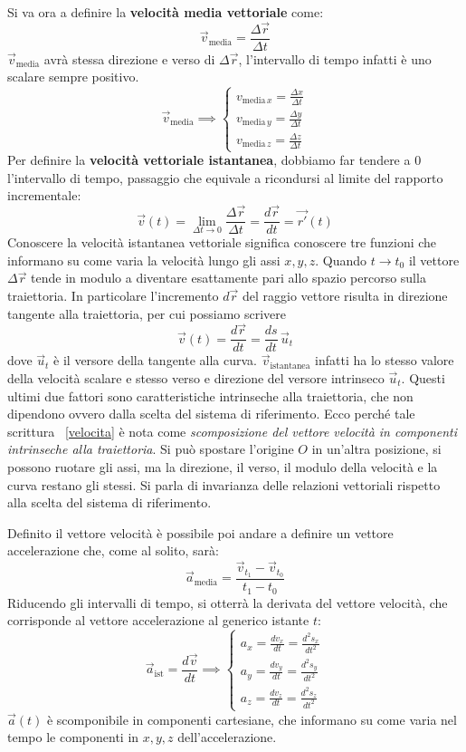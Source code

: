 \documentclass[10pt,a4paper]{book}
\begin{document}
Si va ora a definire la \textbf{velocità media vettoriale} come:
\[
	\vec{v}_{\text{media}}=\frac{\Delta\vec{r}}{\Delta t}
\]
$\vec{v}_{\text{media}}$ avrà stessa direzione e verso di $\Delta\vec{r}$, l'intervallo di tempo infatti è uno scalare sempre positivo.
\[
	\vec{v}_{\text{media}}\implies \begin{cases} v_{\text{media} \,x} =\frac{\Delta x}{\Delta t} \\ v_{\text{media} \,y} =\frac{\Delta y}{\Delta t} \\ v_{\text{media} \,z} =\frac{\Delta z}{\Delta t} \end{cases}
\]
Per definire la \textbf{velocità vettoriale istantanea}, dobbiamo far tendere a $0$ l'intervallo di tempo, passaggio che equivale a ricondursi al limite del rapporto incrementale:
\[
	\vec{v}(t)=\lim_{\Delta t \to 0} \frac{\Delta \vec{r}}{\Delta t}=\frac{d\vec{r}}{dt}=\vec{r'}(t)
\]
Conoscere la velocità istantanea vettoriale significa conoscere tre funzioni che informano su come varia la velocità lungo gli assi $x, y, z$. Quando $t \to t_0$ il vettore $\Delta\vec{r}$ tende in modulo a diventare esattamente pari allo spazio percorso sulla traiettoria. In particolare l'incremento $d\vec{r}$ del raggio vettore risulta in direzione tangente alla traiettoria, per cui possiamo scrivere
\begin{equation}
	\label{velocita}
	\boxed{\vec{v}(t)=\frac{d\vec{r}}{dt}=\frac{ds}{dt}\,\vec{u}_t}
\end{equation}
dove $\vec{u}_t$ è il versore della tangente alla curva. $\vec{v}_\text{istantanea}$ infatti ha lo stesso valore della velocità scalare e stesso verso e direzione del versore intrinseco $\vec{u}_t$.
Questi ultimi due fattori sono caratteristiche intrinseche alla traiettoria, che non dipendono ovvero dalla scelta del sistema di riferimento. Ecco perché tale scrittura ~\eqref{velocita} è nota come \textit{scomposizione del vettore velocità in componenti intrinseche alla traiettoria}.
Si può spostare l'origine $O$ in un'altra posizione, si possono ruotare gli assi, ma la direzione, il verso, il modulo della velocità e la curva restano gli stessi. Si parla di invarianza delle relazioni vettoriali rispetto alla scelta del sistema di riferimento.

Definito il vettore velocità è possibile poi andare a definire un vettore accelerazione che, come al solito, sarà:
\[
	\vec{a}_{\text{media}}=\frac{\vec{v}_{t_1}-\vec{v}_{t_0}}{t_1-t_0}
\]
Riducendo gli intervalli di tempo, si otterrà la derivata del vettore velocità, che corrisponde al vettore accelerazione al generico istante $t$:
\[
	\vec{a}_{\text{ist}}=\frac{d\vec{v}}{dt} \implies
		\begin{cases}
		a_x=\frac{dv_x}{dt}=\frac{d^2s_x}{dt^2} \\
		a_y=\frac{dv_y}{dt}=\frac{d^2s_y}{dt^2}\\
		a_z=\frac{dv_z}{dt}=\frac{d^2s_z}{dt^2}
		\end{cases}
\]
$\vec{a}(t)$ è scomponibile in componenti cartesiane, che informano su come varia nel tempo le componenti in $x, y, z$ dell'accelerazione.
\end{document}
